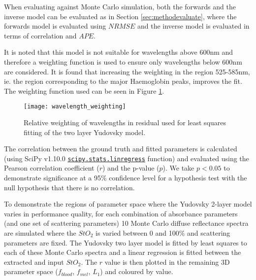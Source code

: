When evaluating against Monte Carlo simulation, both the forwards and the inverse model can be evaluated as in Section \ref{sec:methodevaluate}, where the forwards model is evaluated using $NRMSE$ and the inverse model is evaluated in terms of correlation and $APE$. 

It is noted that this model is not suitable for wavelengths above 600nm \cite{Yudovsky2011a} and therefore a weighting function is used to ensure only wavelengths below 600nm are considered. It is found that increasing the weighting in the region 525-585nm, ie. the region corresponding to the major Haemoglobin peaks, improves the fit. The weighting function used can be seen in Figure \ref{fig:weighting}. 
\begin{figure}
    \centering
    \texttt{[image: wavelength\_weighting]}
    \caption{Relative weighting of wavelengths in residual used for least squares fitting of the two layer Yudovsky model.}
    \label{fig:weighting}
\end{figure}
The correlation between the ground truth and fitted parameters is calculated (using SciPy v1.10.0 \href{https://docs.scipy.org/doc/scipy/reference/generated/scipy.stats.linregress.html}{\texttt{scipy.stats.linregress}} function) and evaluated using the Pearson correlation coefficient ($r$) and the p-value ($p$). We take $p < 0.05$ to demonstrate significance at a 95\% confidence level for a hypothesis test with the null hypothesis that there is no correlation. 

To demonstrate the regions of parameter space where the Yudovsky 2-layer model varies in performance quality, for each combination of absorbance parameters (and one set of scattering parameters) 10 Monte Carlo diffuse reflectance spectra are simulated where the $StO_2$ is varied between 0 and 100\% and scattering parameters are fixed. The Yudovsky two layer model is fitted by least squares to each of these Monte Carlo spectra and a linear regression is fitted between the extracted and input $StO_2$. The $r$ value is then plotted in the remaining 3D parameter space ($f_{blood}$, $f_{mel}$, $L_1$) and coloured by value.

